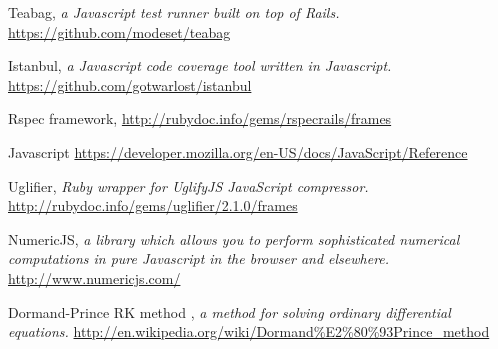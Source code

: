 \documentclass{report}
\begin{document}
\begin{thebibliography}{9}
Teabag,
\emph{ a Javascript test runner built on top of Rails.}
\href{https://github.com/modeset/teabag}{https://github.com/modeset/teabag}

Istanbul,
\emph{a Javascript code coverage tool written in Javascript.}
\href{https://github.com/gotwarlost/istanbul}{https://github.com/gotwarlost/istanbul}

Rspec framework,
\href{http://rubydoc.info/gems/rspec\-rails/frames}{http://rubydoc.info/gems/rspec\-rails/frames}

Javascript
\href{https://developer.mozilla.org/en-US/docs/JavaScript/Reference}{https://developer.mozilla.org/en-US/docs/JavaScript/Reference}

Uglifier,
\emph{Ruby wrapper for UglifyJS JavaScript compressor.}
\href{http://rubydoc.info/gems/uglifier/2.1.0/frames}{http://rubydoc.info/gems/uglifier/2.1.0/frames}

NumericJS,
\emph{a library which allows you to perform sophisticated numerical computations in pure Javascript in the browser and elsewhere.}
\href{http://www.numericjs.com/}{http://www.numericjs.com/}

Dormand-Prince RK method ,
\emph{a method for solving ordinary differential equations.}
\href{http://en.wikipedia.org/wiki/Dormand\%E2\%80\%93Prince\_method}{http://en.wikipedia.org/wiki/Dormand\%E2\%80\%93Prince\_method}

\end{thebibliography}
\end{document}
